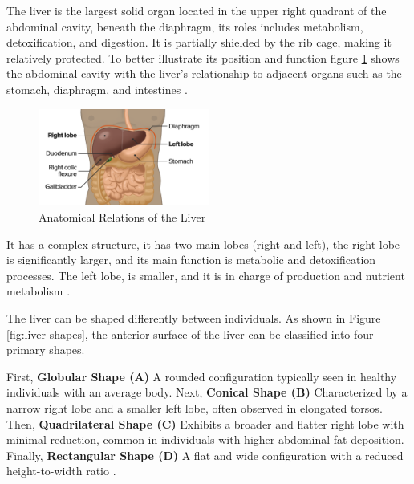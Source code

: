 \documentclass[11pt]{article} %
\begin{document}
\begin{multicols}{2}
The liver is the largest solid organ located in the upper right quadrant of the abdominal cavity, beneath the diaphragm, its roles includes metabolism, detoxification, and digestion. It is partially shielded by the rib cage, making it relatively protected. To better illustrate its position and function figure \ref{fig:liver-relations} shows the abdominal cavity with the liver’s relationship to adjacent organs such as the stomach, diaphragm, and intestines \cite{lecturio2023,ozmen2020}. 

\begin{figure}[H] %
	\centering
	\includegraphics[width=0.5\textwidth]{assets/Liver-relations.png} %
	\caption{Anatomical Relations of the Liver}
	\label{fig:liver-relations}
\end{figure}

It has a complex structure, it has two main lobes (right and left), the right lobe is significantly larger, and its main function is metabolic and detoxification processes. The left lobe, is smaller, and it is in charge of production and nutrient metabolism \cite{ozmen2020}.

The liver can be shaped differently between individuals. As shown in Figure \ref{fig:liver-shapes}, the anterior surface of the liver can be classified into four primary shapes.

First, \textbf{Globular Shape (A)} A rounded configuration typically seen in healthy individuals with an average body. Next, \textbf{Conical Shape (B)} Characterized by a narrow right lobe and a smaller left lobe, often observed in elongated torsos. Then, \textbf{Quadrilateral Shape (C)} Exhibits a broader and flatter right lobe with minimal reduction, common in individuals with higher abdominal fat deposition. Finally, \textbf{Rectangular Shape (D)} A flat and wide configuration with a reduced height-to-width ratio \cite{ozmen2020,diagnostics13142371}.



\end{multicols}
\end{document}

